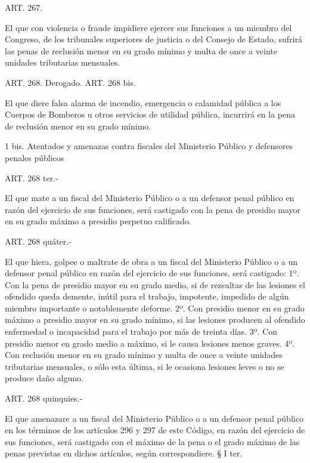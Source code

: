     ART. 267.

    El que con violencia o fraude impidiere ejercer sus funciones a un miembro del Congreso, de los tribunales superiores de justicia o del Consejo de Estado, sufrirá las penas de reclusión menor en su grado mínimo y multa de once a veinte unidades tributarias mensuales.








    ART. 268. Derogado.
    ART. 268 bis.

    El que diere falsa alarma de incendio, emergencia o calamidad pública a los Cuerpos de Bomberos u otros servicios de utilidad pública, incurrirá en la pena de reclusión menor en su grado mínimo.

1 bis. Atentados y amenazas contra fiscales del Ministerio Público y defensores penales públicos


    ART. 268 ter.-

    El que mate a un fiscal del Ministerio Público o a un defensor penal público en razón del ejercicio de sus funciones, será castigado con la pena de presidio mayor en su grado máximo a presidio perpetuo calificado.

    ART. 268 quáter.-

    El que hiera, golpee o maltrate de obra a un fiscal del Ministerio Público o a un defensor penal público en razón del ejercicio de sus funciones, será castigado:
    1º. Con la pena de presidio mayor en su grado medio, si de rezsultas de las lesiones el ofendido queda demente, inútil para el trabajo, impotente, impedido de algún miembro importante o notablemente deforme.
    2º. Con presidio menor en su grado máximo a presidio mayor en su grado mínimo, si las lesiones producen al ofendido enfermedad o incapacidad para el trabajo por más de treinta días.
    3º. Con presidio menor en grado medio a máximo, si le causa lesiones menos graves.
    4º. Con reclusión menor en su grado mínimo y multa de once a veinte unidades tributarias mensuales, o sólo esta última, si le ocasiona lesiones leves o no se produce daño alguno.

    ART. 268 quinquies.-

    El que amenazare a un fiscal del Ministerio Público o a un defensor penal público en los términos de los artículos 296 y 297 de este Código, en razón del ejercicio de sus funciones, será castigado con el máximo de la pena o el grado máximo de las penas previstas en dichos artículos, según correspondiere.
    § I ter.

